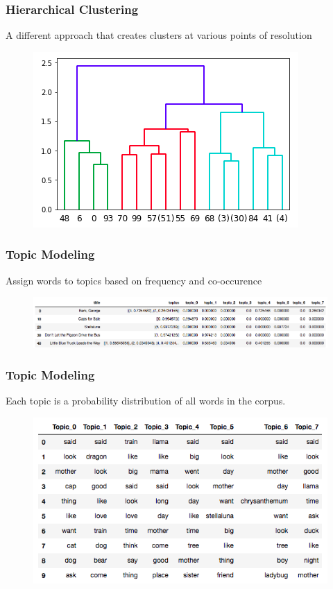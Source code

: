 \documentclass{beamer}
\begin{document}
\begin{frame}
	\frametitle{Hierarchical Clustering}
	A different approach that creates clusters at various points of resolution
	\begin{figure}
		\includegraphics[width=.9\linewidth]{cutoffdendro.png}
	\end{figure}
\end{frame}

\begin{frame}
	\frametitle{Topic Modeling}
	Assign words to topics based on frequency and co-occurence
	\begin{figure}
		\includegraphics[width=1.0\linewidth]{ldatable.png}
	\end{figure}
\end{frame}

\begin{frame}
	\frametitle{Topic Modeling}
	Each topic is a probability distribution of all words in the corpus.
	\begin{figure}
		\includegraphics[width=1.0\linewidth]{ldawords.png}
	\end{figure}
\end{frame}
\end{document}
